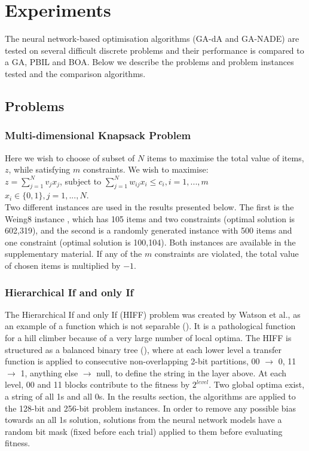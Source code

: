 \documentclass[twoside]{article}
\begin{document}
\section{Experiments}
\label{sec:experiments}
The neural network-based optimisation algorithms (GA-dA and GA-NADE) are tested on several difficult discrete problems and their performance is compared to a GA, PBIL and BOA. Below we describe the problems and problem instances tested and the comparison algorithms.
\subsection{Problems}
\label{sec:problems}
\subsubsection{Multi-dimensional Knapsack Problem}
Here we wish to choose of subset of \(N\) items to maximise the total value of items, \(z\), while satisfying \(m\) constraints. We wish to maximise:
\vspace{2mm}\\
\(z = \sum_{j=1}^{N} v_jx_j\), subject to \(\sum_{j=1}^{N} w_{ij}x_i \leq c_i, i = 1, ..., m\)
\vspace{2mm}\\
\(x_i \in \{0,1\}, j = 1, ..., N\).
\vspace{2mm}\\
Two different instances are used in the results presented below. The first is the Weing8 instance \cite{weingartner1967methods}, which has 105 items and two constraints (optimal solution is 602,319), and the second is a randomly generated instance with 500 items and one constraint (optimal solution is 100,104). Both instances are available in the supplementary material. If any of the \(m\) constraints are violated, the total value of chosen items is multiplied by \(-1\).
\subsubsection{Hierarchical If and only If}
The Hierarchical If and only If (HIFF) problem was created by Watson et al., as an example of a function which is not separable (\cite{watson1999hierarchically}). It is a pathological function for a hill climber because of a very large number of local optima. The HIFF is structured as a balanced binary tree (\cite{hboa}), where at each lower level a transfer function is applied to consecutive non-overlapping 2-bit partitions, 00 \(\rightarrow\) 0, 11 \(\rightarrow\) 1, anything else \(\rightarrow\) null, to define the string in the layer above. At each level, 00 and 11 blocks contribute to the fitness by \(2^{level}\). Two global optima exist, a string of all 1s and all 0s. In the results section, the algorithms are applied to the 128-bit and 256-bit problem instances. In order to remove any possible bias towards an all 1s solution, solutions from the neural network models have a random bit mask (fixed before each trial) applied to them before evaluating fitness.
\end{document}
